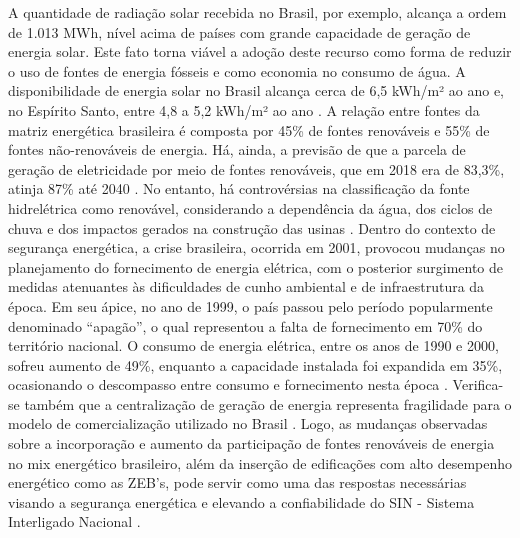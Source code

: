 \begin{onehalfspace}
A quantidade de radiação solar recebida no Brasil, por exemplo, alcança a ordem de 1.013 MWh, nível acima de países com grande capacidade de geração de energia solar. Este fato torna viável a adoção deste recurso como forma de reduzir o uso de fontes de energia fósseis e como economia no consumo de água. A disponibilidade de energia solar no Brasil alcança cerca de 6,5 kWh/m² ao ano e, no Espírito Santo, entre 4,8 a 5,2 kWh/m² ao ano \cite{AgenciadeRegulacaodeServicosPublicosdoEspiritoSanto-ARSP2019, Didone2014,InternationalEnergyAgency-IEA2018}.\vspace*{0.3cm} \newline
A relação entre fontes da matriz energética brasileira é composta por 45\% de fontes renováveis e 55\% de fontes não-renováveis de energia. Há, ainda, a previsão de que a parcela de geração de eletricidade por meio de fontes renováveis, que em 2018 era de 83,3\%, atinja 87\% até 2040 \cite{EmpresadePesquisaEnergetica-EPE2017}. No entanto, há controvérsias na classificação da fonte hidrelétrica como renovável, considerando a dependência da água, dos ciclos de chuva e dos impactos gerados na construção das usinas \cite{Leme2012}.\vspace*{0.3cm} \newline
Dentro  do  contexto  de  segurança  energética,  a  crise  brasileira,  ocorrida  em  2001, provocou mudanças no planejamento do fornecimento de energia elétrica, com o posterior surgimento de medidas  atenuantes  às dificuldades  de  cunho  ambiental  e  de  infraestrutura  da  época.  Em  seu ápice, no ano de 1999, o país passou pelo período popularmente denominado “apagão”, o qual representou  a  falta  de  fornecimento  em  70\%  do  território  nacional.  O  consumo  de  energia elétrica, entre os anos de 1990 e 2000, sofreu aumento de 49\%, enquanto a capacidade instalada foi expandida em 35\%, ocasionando o descompasso entre consumo e fornecimento nesta época \cite{Conejero2016,Tolmasquim2000}.\vspace*{0.3cm} \newline
Verifica-se  também  que  a  centralização  de  geração  de  energia  representa  fragilidade  para  o modelo  de  comercialização  utilizado  no  Brasil \cite{Pinto2017}. Logo,  as mudanças observadas sobre a incorporação e aumento da participação de fontes renováveis de energia  no mix  energético  brasileiro,  além  da  inserção  de  edificações  com  alto  desempenho energético como as ZEB’s, pode servir como uma das respostas necessárias visando a segurança energética  e  elevando  a  confiabilidade  do  SIN  -  Sistema  Interligado Nacional \cite{EmpresadePesquisaEnergetica-EPE2017a}.\vspace*{0.3cm} \newline

\end{onehalfspace}
